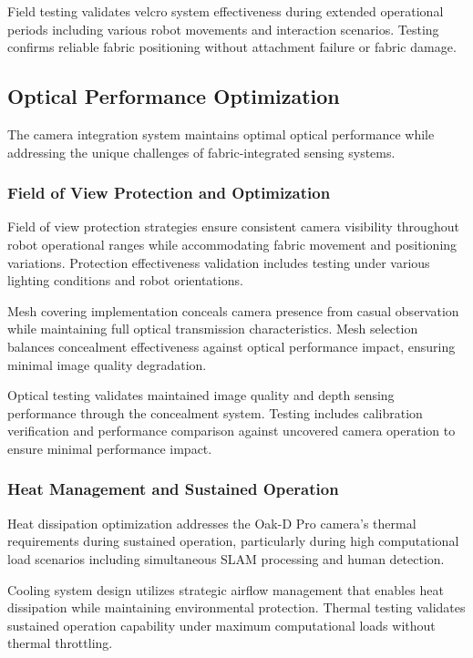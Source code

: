 Field testing validates velcro system effectiveness during extended operational periods including various robot movements and interaction scenarios. Testing confirms reliable fabric positioning without attachment failure or fabric damage.

\subsection{Optical Performance Optimization}

The camera integration system maintains optimal optical performance while addressing the unique challenges of fabric-integrated sensing systems.

\subsubsection{Field of View Protection and Optimization}

Field of view protection strategies ensure consistent camera visibility throughout robot operational ranges while accommodating fabric movement and positioning variations. Protection effectiveness validation includes testing under various lighting conditions and robot orientations.

Mesh covering implementation conceals camera presence from casual observation while maintaining full optical transmission characteristics. Mesh selection balances concealment effectiveness against optical performance impact, ensuring minimal image quality degradation.

Optical testing validates maintained image quality and depth sensing performance through the concealment system. Testing includes calibration verification and performance comparison against uncovered camera operation to ensure minimal performance impact.

\subsubsection{Heat Management and Sustained Operation}

Heat dissipation optimization addresses the Oak-D Pro camera's thermal requirements during sustained operation, particularly during high computational load scenarios including simultaneous SLAM processing and human detection.

Cooling system design utilizes strategic airflow management that enables heat dissipation while maintaining environmental protection. Thermal testing validates sustained operation capability under maximum computational loads without thermal throttling.

